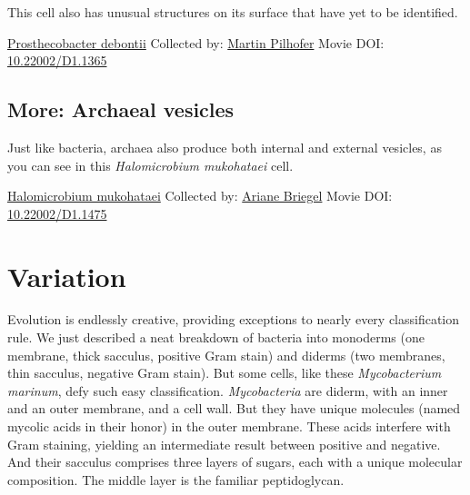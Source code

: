 \documentclass[]{tufte-book}
\begin{document}
This cell also has unusual structures on its surface that have yet to be identified.



\hypertarget{htmlwidget-e0222272216b7d212b1d}{}

\label{fig:2-4d}\protect\hyperlink{tree}{Prosthecobacter debontii} Collected by: \protect\hyperlink{martin_pilhofer}{Martin Pilhofer} Movie DOI: \href{https://doi.org/10.22002/D1.1365}{10.22002/D1.1365}

\hypertarget{Archaeal_vesicles}{%
\subsection*{More: Archaeal vesicles}\label{Archaeal_vesicles}}

Just like bacteria, archaea also produce both internal and external vesicles, as you can see in this \emph{Halomicrobium mukohataei} cell.



\hypertarget{htmlwidget-c129ac1b923ef1e5fc8e}{}

\label{fig:2-4e}\protect\hyperlink{tree}{Halomicrobium mukohataei} Collected by: \protect\hyperlink{ariane_briegel}{Ariane Briegel} Movie DOI: \href{https://doi.org/10.22002/D1.1475}{10.22002/D1.1475}

\hypertarget{variation}{%
\section{Variation}\label{variation}}

Evolution is endlessly creative, providing exceptions to nearly every classification rule. We just described a neat breakdown of bacteria into monoderms (one membrane, thick sacculus, positive Gram stain) and diderms (two membranes, thin sacculus, negative Gram stain). But some cells, like these \emph{Mycobacterium marinum}, defy such easy classification. \emph{Mycobacteria} are diderm, with an inner and an outer membrane, and a cell wall. But they have unique molecules (named mycolic acids in their honor) in the outer membrane. These acids interfere with Gram staining, yielding an intermediate result between positive and negative. And their sacculus comprises three layers of sugars, each with a unique molecular composition. The middle layer is the familiar peptidoglycan.
\end{document}
